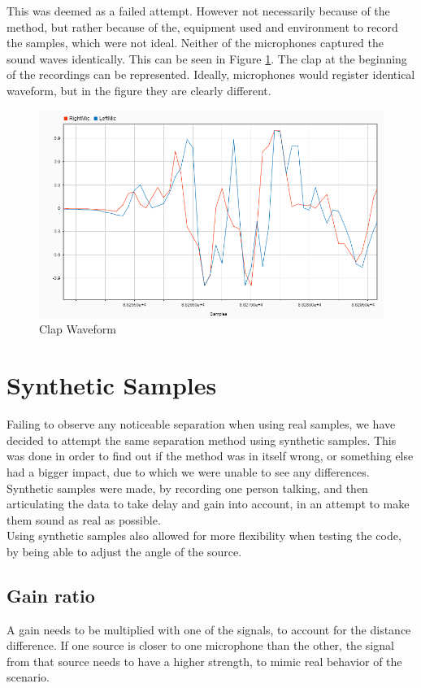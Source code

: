 This was deemed as a failed attempt. However not necessarily because of the method, 
but rather because of the, equipment used and environment to record the samples, 
which were not ideal. Neither of the microphones captured the sound waves 
identically. This can be seen in Figure \ref{fig:clap}. The clap at the beginning 
of the recordings can be represented. Ideally, microphones would register identical 
waveform, but in the figure they are clearly different.\\


\begin{figure}[htp]
  \centering
  \includegraphics[width=0.7\linewidth]{Illustrations/clap.png}
  \caption{Clap Waveform}
  \label{fig:clap}
\end{figure}
\newpage

\section{Synthetic Samples}
Failing to observe any noticeable separation when using real samples, we have 
decided to attempt the same separation method using synthetic samples. This was 
done in order to find out if the method was in itself wrong, or something else had 
a bigger impact, due to which we were unable to see any differences. Synthetic 
samples were made, by recording one person talking, and then articulating the data 
to take delay and gain into account, in an attempt to make them sound as real as 
possible.\\


Using synthetic samples also allowed for more flexibility when testing the code, by 
being able to adjust the angle of the source. 

\subsection*{Gain ratio}
A gain needs to be multiplied with one of the signals, to account for the distance 
difference. If one source is closer to one microphone than the other, the signal 
from that source needs to have a higher strength, to mimic real behavior of the 
scenario. \cite{GAIN}

